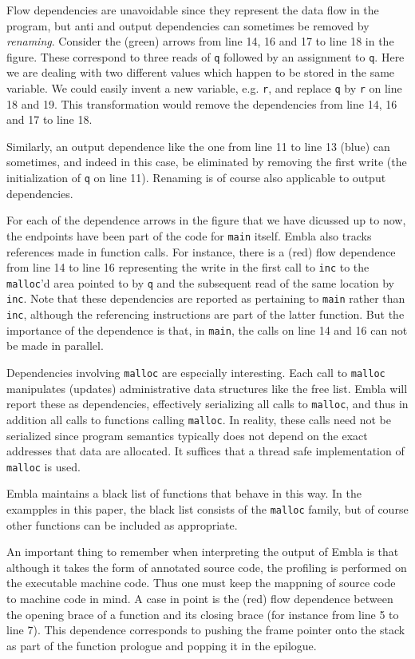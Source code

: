 Flow dependencies are unavoidable since they represent the data flow 
in the program, but anti and output dependencies can sometimes be 
removed by {\em renaming}. Consider the (green) arrows from line 
14, 16 and 17 to line 18 in the figure. These correspond to three
reads of {\tt q} followed by an assignment to {\tt q}. Here we 
are dealing with two different values which happen to be stored 
in the same variable. We could easily invent a new variable, e.g. 
{\tt r}, and replace {\tt q} by {\tt r} on line 18 and 19. This 
transformation would remove the dependencies from line 14, 16 and
17 to line 18. 

Similarly, an output dependence like the one from line 11 to line 13
(blue) can sometimes, and indeed in this case, be eliminated by 
removing the first write (the initialization of {\tt q} on line 11).
Renaming is of course also applicable to output dependencies.

For each of the dependence arrows in the figure that 
we have dicussed up to now, the endpoints have been part of the 
code for {\tt main}
itself. Embla also tracks references made in function calls. For
instance, there is a (red) flow dependence from line 14 to line 16
representing the write in the first call to {\tt inc} to the 
{\tt malloc}'d area pointed to by {\tt q} and the subsequent read 
of the same location by {\tt inc}. Note that these dependencies 
are reported as pertaining to {\tt main} rather than {\tt inc},
although the referencing instructions are part of the latter function. 
But the importance of the dependence is that, in {\tt main}, the calls
on line 14 and 16 can not be made in parallel.

Dependencies involving {\tt malloc} are especially interesting.
Each call to {\tt malloc} manipulates (updates) 
administrative data structures like the free list. Embla will
report these as dependencies, effectively serializing all calls to 
{\tt malloc}, and thus in addition all calls to functions calling
{\tt malloc}. In reality, these calls need not be serialized since
program semantics typically does not depend on the exact addresses 
that data are allocated. It suffices that a thread safe 
implementation of {\tt malloc} is used.

Embla maintains a black list of functions that behave in this way.
In the exampples in this paper, the black list consists of the 
{\tt malloc} family, but of course other functions can be included 
as appropriate. 

An important thing to remember when interpreting the output of Embla 
is that although it takes the form of annotated source code, the 
profiling is performed on the executable machine code. Thus one must
keep the mappning of source code to machine code in mind. A case in 
point is the (red) flow dependence between the opening brace of a 
function and its closing brace (for instance from line 5 to line 7).
This dependence corresponds to pushing the frame pointer onto the 
stack as part of the function prologue and popping it in the 
epilogue.

\begin{figure} 
\small

\end{figure}

